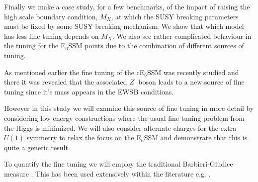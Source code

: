 \documentclass[preprint,amsmath,amssymb,aps,superscriptaddress,prd,
showpacs,floatfix,nofootinbib]{revtex4-1}
\begin{document}
Finally we make a case study, for a few benchmarks, of the impact of
raising the high scale boundary condition, $M_X$, at which the SUSY
breaking parameters must be fixed by some SUSY breaking mechanism.  We
show that which model has less fine tuning depends on $M_X$.  We also
see rather complicated behaviour in the tuning for the E$_6$SSM points
due to the combination of different sources of tuning.

As mentioned earlier the fine tuning of the cE$_6$SSM was recently studied
\cite{Athron:2013ipa} and there it was revealed that the associated
$Z^\prime$ boson leads to a new source of fine tuning since it's mass
appears in the EWSB conditions.

However in this study we will examine this source of fine tuning in more
detail by considering low energy constructions where the usual fine
tuning problem from the Higgs is minimized.  We will also consider
alternate charges for the extra $U(1)$ symmetry to relax the focus on
the E$_6$SSM and demonstrate that this is quite a generic result.

To quantify the fine tuning we will employ the traditional
Barbieri-Giudice measure \cite{Ellis:1986yg, Barbieri:1987fn}.  This
has been used extensively within the literature
e.g. \cite{deCarlos:1993yy, deCarlos:1993ca, Chankowski:1997zh,
  Agashe:1997kn, Wright:1998mk, Kane:1998im, BasteroGil:1999gu,
  Feng:1999zg, Allanach:2000ii, Dermisek:2005ar, Barbieri:2005kf,
  Allanach:2006jc, Gripaios:2006nn, Dermisek:2006py, Barbieri:2006dq,
  Kobayashi:2006fh, Perelstein:2012qg, Antusch:2012gv,Cheng:2012pe,
  CahillRowley:2012rv, Ross:2012nr, Basak:2012bd, Kang:2012sy,
  Athron:2013ipa, Boehm:2013qva, Miller:2013jra, Binjonaid:2014oga,
  Miller:2014jza}.
\end{document}
